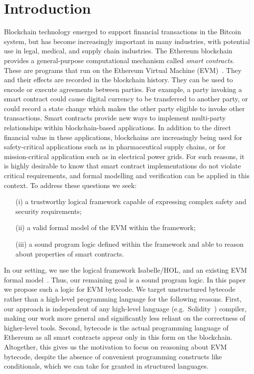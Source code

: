 \documentclass[sigplan,10pt]{acmart}\settopmatter{printfolios=true,printccs=false,printacmref=false}
\begin{document}
\section{Introduction}
\label{sec:intro}
Blockchain technology emerged to support financial transactions in the Bitcoin system, but has become
increasingly important in many industries, with potential use in legal, medical, and
supply chain industries.
The Ethereum blockchain provides a general-purpose computational mechanism called \emph{smart contracts}.
These are programs that run on the Ethereum Virtual Machine (EVM)~\cite{wood2014ethereum}. They and their effects 
are recorded in the blockchain history.  They can be used to encode or execute agreements between parties.
For example, a party invoking a smart contract could cause digital currency to be transferred to another
party, or could record a state change which makes the other party eligible to invoke other transactions.
Smart contracts provide new ways to implement multi-party relationships within blockchain-based applications.
In addition to the direct financial value in these applications, blockchains are increasingly being
used for safety-critical applications such as in pharmaceutical supply chains, or for mission-critical
application such as in electrical power grids.
For such reasons, it is highly desirable to know that smart contract implementations do not violate critical requirements, and
formal modelling and verification can be applied in this context.
%
To address these questions we seek:
\begin{itemize}
\item[(i)] a trustworthy logical framework capable of expressing complex safety and security
   requirements; 
\item[(ii)] a valid formal model of the EVM within the framework; 
\item[(iii)] a sound program logic defined within the framework and able to
reason about properties of smart contracts. 
\end{itemize}
In our setting, we use the logical framework Isabelle/HOL, and an existing EVM formal
model~\cite{Yoichi}.
Thus, our remaining goal is a sound program logic.  In this paper we propose such a logic for EVM bytecode. 
We target unstructured bytecode rather than a high-level programming language for the following reasons.
First, our approach is independent of any high-level language (e.g.\ Solidity~\cite{solidity}) compiler, 
making our work more general and significantly less reliant
on the correctness of higher-level tools.
Second, bytecode is the actual programming language of Ethereum as all smart contracts appear only
in this form on the blockchain. 
Altogether, this gives us the motivation to focus on reasoning about EVM bytecode, despite the absence of %
convenient programming constructs like conditionals,
which we can take for granted in structured languages.
\end{document}
